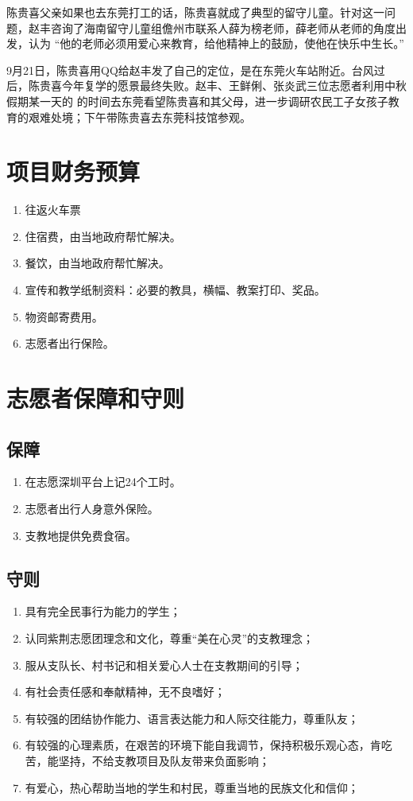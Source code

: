 \documentclass[12pt]{ctexart}
\begin{document}
\begin{appendix}
陈贵喜父亲如果也去东莞打工的话，陈贵喜就成了典型的留守儿童。针对这一问题，赵丰咨询了海南留守儿童组儋州市联系人薛为榜老师，薛老师从老师的角度出发，认为
“他的老师必须用爱心来教育，给他精神上的鼓励，使他在快乐中生长。”

9月21日，陈贵喜用QQ给赵丰发了自己的定位，是在东莞火车站附近。台风过后，陈贵喜今年复学的愿景最终失败。赵丰、王鲜俐、张炎武三位志愿者利用中秋假期某一天的
的时间去东莞看望陈贵喜和其父母，进一步调研农民工子女孩子教育的艰难处境；下午带陈贵喜去东莞科技馆参观。
\section{项目财务预算}\label{scheduling}
\begin{enumerate}
\item 往返火车票
\item 住宿费，由当地政府帮忙解决。
\item 餐饮，由当地政府帮忙解决。
\item 宣传和教学纸制资料：必要的教具，横幅、教案打印、奖品。
\item 物资邮寄费用。
\item 志愿者出行保险。
\end{enumerate}
\section{志愿者保障和守则}
\subsection{保障}
\begin{enumerate}
\item 在志愿深圳平台上记24个工时。
\item 志愿者出行人身意外保险。
\item 支教地提供免费食宿。
\end{enumerate}
\subsection{守则}
\begin{enumerate}[label = {(\chinese*)}]
\item 具有完全民事行为能力的学生；
\item 认同紫荆志愿团理念和文化，尊重“美在心灵”的支教理念；
\item 服从支队长、村书记和相关爱心人士在支教期间的引导；
\item 有社会责任感和奉献精神，无不良嗜好；
\item 有较强的团结协作能力、语言表达能力和人际交往能力，尊重队友；
\item 有较强的心理素质，在艰苦的环境下能自我调节，保持积极乐观心态，肯吃苦，能坚持，不给支教项目及队友带来负面影响； 
\item 有爱心，热心帮助当地的学生和村民，尊重当地的民族文化和信仰；
\end{enumerate}
\end{appendix}
\end{document}
